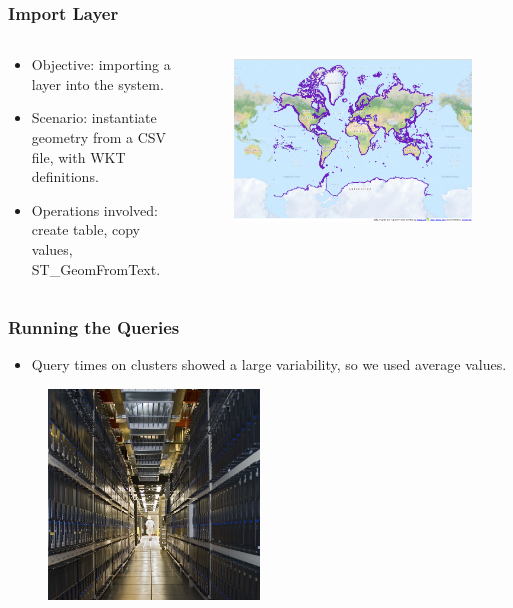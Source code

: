 \documentclass[hyperref={pdfpagelabels=true}]{beamer}
\begin{document}
\begin{frame}
\frametitle{Import Layer}
\begin{columns}
  \begin{column}{0.5\textwidth}
  \begin{itemize}    
    \item<1->Objective: importing a layer into the system.
    \item<1->Scenario: instantiate geometry from a CSV file, with WKT definitions.
    \item<1->Operations involved: create table, copy values, ST\_GeomFromText.    
  \end{itemize} 
 \end{column}  
  \begin{column}{0.5\textwidth}      
    \begin{figure}       
	\includegraphics[width=\textwidth]{coastline.png}      
     \end{figure} 
 \end{column}  
\end{columns}           
\end{frame}

\begin{frame}
\frametitle{Running the Queries}
  \begin{itemize}    
    \item<1->Query times on clusters showed a large variability, so we used average values.%
  \end{itemize} 
\begin{figure}       
    \includegraphics[width=0.5\textwidth]{modern_cluster.jpg}      
\end{figure}      
\end{frame}
\end{document}
